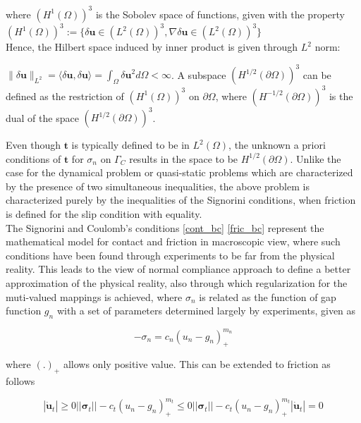 where $(H^1(\Omega))^3$ is the Sobolev space of functions, given with the property\\ 

$(H^1(\Omega))^3 := \{ \delta \bm u \in (L^2(\Omega))^3, \nabla\delta \bm u  \in (L^2(\Omega))^3 \}$\\ 

Hence, the Hilbert space induced by inner product is given through $L^2$ norm:
  
${\|{\delta \bm u}\|_{L^2}= \langle {\delta \bm u},{\delta \bm u} \rangle=\int_{\Omega} {\delta \bm u}^2 d\Omega < \infty }$. A subspace $(H^{1/2}(\partial\Omega))^3$ can be defined as the restriction of $(H^{1}(\Omega))^3$ on $\partial\Omega$, where $(H^{-1/2}(\partial\Omega))^3$ is the dual of the space $(H^{1/2}(\partial\Omega))^3$.

Even though  $\bm{t}$ is typically defined to be in $L^2(\Omega)$, the unknown a priori conditions of $\bm{t}$ for $\sigma_n$ on $\Gamma_C$ results in the space to be $H^{1/2}(\partial\Omega)$.
Unlike the case for the dynamical problem or quasi-static problems which are characterized by the presence of two simultaneous inequalities, the above problem is characterized purely by the inequalities of the Signorini conditions, when friction is defined for the slip condition with equality.\\

The Signorini and Coulomb's conditions \eqref{cont_bc} \eqref{fric_bc} represent the mathematical model for contact and friction in macroscopic view, where such conditions have been found through experiments to be far from the physical reality. This leads to the view of normal compliance approach to define a better approximation of the physical reality, also through which regularization for the muti-valued mappings is achieved, where $\sigma_n$ is related as the function of gap function $g_n$ with a set of parameters determined largely by experiments, given as  

\begin{equation}\label{normal_comp}
-\sigma_n = c_n(u_n-g_n)_+^{m_n}
\end{equation}

where  $(.)_+$ allows only positive value. This can be extended to friction as follows

\begin{subequations}
\begin{equation}
|\bm{\dot{u}}_t| \geq 0
\end{equation} 

\begin{equation}
||\bm\sigma_{t}||-c_t(u_n-g_n)_+^{m_t} \leq 0
\end{equation}

\begin{equation}
 ||\bm\sigma_{t}||-c_t(u_n-g_n)_+^{m_t} |\bm{\dot{u}}_t| = 0
\end{equation}

\end{subequations}

